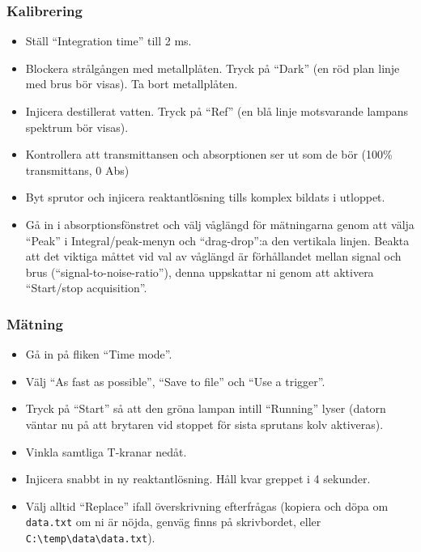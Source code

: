 \subsubsection{Kalibrering}
\begin{itemize}
\item Ställ ``Integration time'' till 2 ms.
\item Blockera strålgången med metallplåten. Tryck på ``Dark'' (en röd
  plan linje med brus bör visas). Ta bort
  metallplåten.
\item Injicera destillerat vatten. Tryck på ``Ref'' (en blå linje
  motsvarande lampans spektrum bör visas).
\item Kontrollera att transmittansen och absorptionen ser ut som de
  bör (100\% transmittans, 0 Abs)
\item Byt sprutor och injicera reaktantlösning tills komplex bildats i utloppet.
\item Gå in i absorptionsfönstret och välj våglängd
  för mätningarna genom att välja ``Peak'' i Integral/peak-menyn
  och ``drag-drop'':a den vertikala linjen. Beakta att det
  viktiga måttet vid val av våglängd är förhållandet mellan signal och brus
  (``signal-to-noise-ratio''), denna uppskattar ni genom att aktivera
  ``Start/stop acquisition''.
\end{itemize}
\subsubsection{Mätning}
\begin{itemize}
\item Gå in på fliken ``Time mode''.
\item Välj ``As fast as possible'', ``Save to file'' och ``Use a trigger''.
\item Tryck på ``Start'' så att den gröna lampan intill ``Running'' lyser
  (datorn väntar nu på att brytaren vid stoppet för sista sprutans kolv aktiveras).
\item Vinkla samtliga T-kranar nedåt.
\item Injicera snabbt in ny reaktantlösning. Håll kvar greppet i 4 sekunder.
\item Välj alltid ``Replace'' ifall överskrivning efterfrågas (kopiera
  och döpa om {\tt data.txt} om ni är nöjda, genväg finns på skrivbordet, eller {\tt
    C:\textbackslash temp\textbackslash data\textbackslash data.txt}).
\end{itemize}

